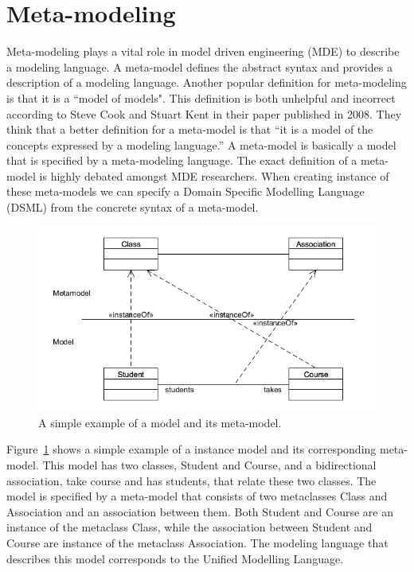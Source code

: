 \section{Meta-modeling}

Meta-modeling plays a vital role in model driven engineering (MDE) to describe a
modeling language. A meta-model defines the abstract syntax and provides a
description of a modeling language. Another popular definition for
meta-modeling is that it is a ``model of models". This definition is both
unhelpful and incorrect according to Steve Cook and Stuart Kent in their
paper\cite{Cook2008} published in 2008. They think that a better definition for
a meta-model is that ``it is a model of the concepts expressed by a modeling
language.'' A meta-model is basically a model that is specified by a
meta-modeling language. The exact definition of a meta-model is highly debated
amongst MDE researchers\cite{Rutle_thesis}. When creating instance of these
meta-models we can specify a Domain Specific Modelling Language (DSML) from the
concrete syntax of a meta-model.

\begin{figure}[H]
	\centering
	\includegraphics[scale=0.6]{./Figures/SimpleMetamodel.png}
	\caption[Example of a model and meta-model]
	{A simple example of a model and its meta-model.}
	\label{fig:SimpleMeta-model}
\end{figure}

Figure~\ref{fig:SimpleMeta-model} shows a simple example of a instance model and
its corresponding meta-model. This model has two classes, Student and Course, and
a bidirectional association, take course and has students, that relate
these two classes. The model is specified by a meta-model that consists of two
metaclasses Class and Association and an association between them. Both Student
and Course are an instance of the metaclass Class, while the association
between Student and Course are instance of the metaclass Association. The
modeling language that describes this model corresponds to the Unified Modelling
Language.

